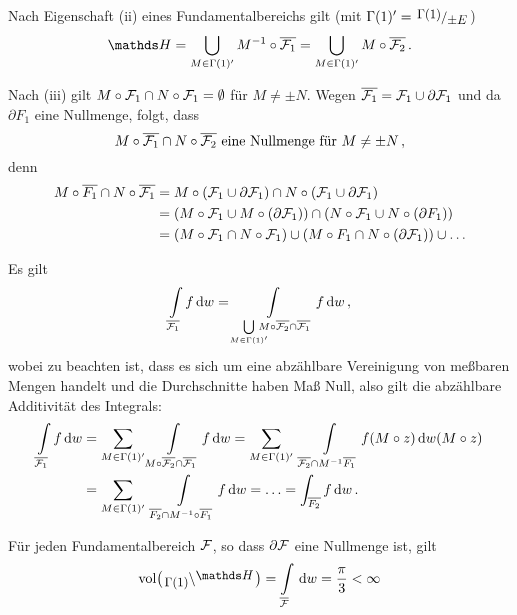 \begin{bewe}
	Nach Eigenschaft (ii) eines Fundamentalbereichs gilt (mit $\Gamma(1)' = \modulo{\Gamma(1)}{\pm E}$)
	\[
	\HH = \bigcup_{M \in \Gamma(1)'} M^{-1} \circ \closure{\F_1} = \bigcup_{M \in \Gamma(1)'} M \circ \closure{\F_2}
	\,.
	\]
	
	Nach (iii) gilt $M \circ \mathcal{F}_1 \cap N \circ \mathcal{F}_1 = \emptyset$ für $M \not= \pm N$.
	Wegen $\overline{\mathcal{F}_1} = \mathcal{F}_1 \cup \partial\mathcal{F}_1$ und da $\partial F_1$ eine Nullmenge, folgt, dass
	\[
	M \circ \overline{\mathcal{F}_1} \cap N\circ\overline{\mathcal{F}_2} \text{ eine Nullmenge für } M\not=\pm N
	\,,
	\]
	denn
	\begin{align*}
	M \circ \overline{F_1} \cap N \circ \overline{\mathcal{F}_1}
	&= M \circ (\mathcal{F}_1 \cup \partial \mathcal{F}_1) \cap N \circ (\mathcal{F}_1 \cup \partial \mathcal{F}_1) \\
	&= (M \circ \mathcal{F}_1 \cup M \circ (\partial \mathcal{F}_1)) \cap (N \circ \mathcal{F}_1 \cup N \circ (\partial F_1)) \\
	&= (M \circ \mathcal{F}_1 \cap N \circ \mathcal{F}_1) \cup (M \circ F_1 \cap N \circ (\partial \mathcal{F}_1)) \cup \ldots
	\end{align*}
	
	Es gilt
	\[
	\int\limits_{\overline{\mathcal{F}_1}} f \,\mathrm{d} w
	= \int\limits_{\bigcup\limits_{M \in \Gamma(1)'} \!\!\!\!\!\! M \circ \overline{\mathcal{F}_2} \cap \overline{\mathcal{F}_1}} f \,\mathrm{d} w
	\,,
	\]
	wobei zu beachten ist, dass es sich um eine abzählbare Vereinigung von meßbaren Mengen handelt und die Durchschnitte haben Maß Null, also gilt die abzählbare Additivität des Integrals:
	\begin{align*}
	\int\limits_{\overline{\mathcal{F}_1}} f \,\mathrm{d} w
	&= \sum_{M \in \Gamma(1)'} \int\limits_{M\circ \overline{\mathcal{F}_2} \cap \overline{\mathcal{F}_1}} f \,\mathrm{d} w
	= \sum_{M \in \Gamma(1)'} \ \int\limits_{\overline{\mathcal{F}_2} \cap M^{-1}\overline{F_1}} f(M \circ z) \,\mathrm{d} w(M \circ z) \\
	&= \sum_{M \in \Gamma(1)'}\ \int\limits_{\overline{F_2} \cap M^{-1} \circ \overline{F_1}} f \,\mathrm{d} w
	= \ldots = \int_{\overline{F_2}} f\,\mathrm{d} w
	\,.
	\end{align*}
\end{bewe}

\begin{bsp}
	Für jeden Fundamentalbereich $\mathcal{F}$, so dass $\partial \mathcal{F}$ eine Nullmenge ist, gilt
	\[
	\vol\bigl(\linksmodulo{\Gamma(1)}\HH\bigr) = \int\limits_{\closure \F} \opd w = \frac{\pi}{3} < \infty
	\]
\end{bsp}

